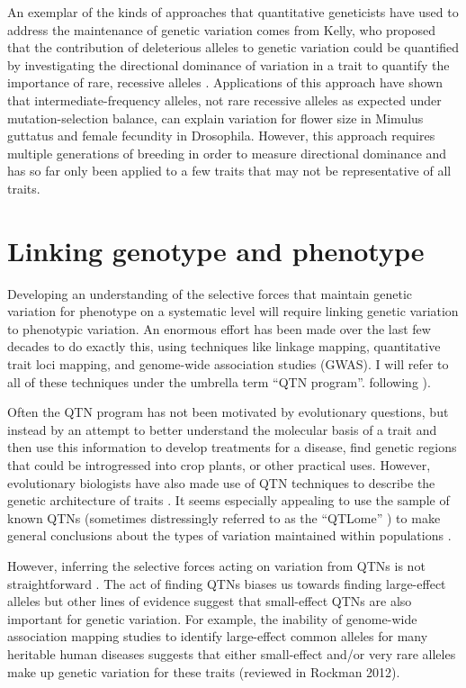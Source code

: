 An exemplar of the kinds of approaches that quantitative geneticists have used to address the maintenance of genetic variation comes from Kelly, who proposed that the contribution of deleterious alleles to genetic variation could be quantified by investigating the directional dominance of variation in a trait to quantify the importance of rare, recessive alleles \citep{Kelly1999-re}. Applications of this approach have shown that intermediate-frequency alleles, not rare recessive alleles as expected under mutation-selection balance, can explain variation for flower size in Mimulus guttatus and female fecundity in Drosophila. \citep{Kelly2001-rc,Charlesworth2007-rp} However, this approach requires multiple generations of breeding in order to measure directional dominance and has so far only been applied to a few traits that may not be representative of all traits. 

\section{Linking genotype and phenotype}
Developing an understanding of the selective forces that maintain genetic variation for phenotype on a systematic level will require linking genetic variation to phenotypic variation. An enormous effort has been made over the last few decades to do exactly this, using techniques like linkage mapping, quantitative trait loci mapping, and genome-wide association studies (GWAS). I will refer to all of these techniques under the umbrella term “QTN program”. following \citet{Rockman2012-ks}).

Often the QTN program has not been motivated by evolutionary questions, but instead by an attempt to better understand the molecular basis of a trait and then use this information to develop treatments for a disease, find genetic regions that could be introgressed into crop plants, or other practical uses. However, evolutionary biologists have also made use of QTN techniques to describe the genetic architecture of traits \citep{lynch1998}. It seems especially appealing to use the sample of known QTNs (sometimes distressingly referred to as the “QTLome” \citep{Martinez_undated-wg}) to make general conclusions about the types of variation maintained within populations \citep{Barton2002-do}.

However, inferring the selective forces acting on variation from QTNs is not straightforward \citep{Rockman2012-ks,Johnson2005-dl}. The act of finding QTNs biases us towards finding large-effect alleles but other lines of evidence suggest that small-effect QTNs are also important for genetic variation. For example, the inability of genome-wide association mapping studies to identify large-effect common alleles for many heritable human diseases suggests that either small-effect and/or very rare alleles make up genetic variation for these traits (reviewed in Rockman 2012). 

